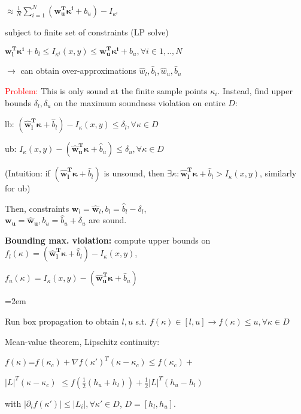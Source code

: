 \documentclass[11pt,landscape,a4paper,fleqn]{article}
\begin{document}
\begin{multicols*}{4}
\hspace*{16mm}$\approx \frac{1}{N} \sum_{i=1}^{N} (\mathbf{w_u^T \kappa^i} + b_u) - I_{\kappa^i}$

subject to finite set of constraints (LP solve)

{$\mathbf{w_l^T \kappa^i} + b_l \leq I_{\kappa^i}(x,y) \leq \mathbf{w_u^T \kappa^i} + b_u, \forall i \in {1,..,N}$}

$\rightarrow$ can obtain over-approximations $\hat{w}_l, \hat{b}_l, \hat{w}_u, \hat{b}_u$

\textcolor{red}{Problem:} This is only sound at the finite sample points $\kappa_i$. Instead, {find upper bounds $\delta_l, \delta_u$ on the maximum soundness violation on entire $D$}:

lb: $(\mathbf{\hat{w}_l^T \kappa} + \hat{b}_l) - I_\kappa(x,y) \leq \delta_l, \forall \kappa \in D$

ub: $I_\kappa(x,y) - (\mathbf{\hat{w}_u^T \kappa} + \hat{b}_u) \leq \delta_u, \forall \kappa \in D$

(Intuition: if $(\mathbf{\hat{w}_l^T \kappa} + \hat{b}_l)$ is unsound, then $\exists \kappa: \mathbf{\hat{w}_l^T \kappa} + \hat{b}_l > I_\kappa(x,y)$, similarly for ub)

Then, constraints $\mathbf{w}_l = \mathbf{\hat{w}}_l, b_l = \hat{b}_l - \delta_l$,\\
$\mathbf{w_u} = \mathbf{\hat{w}_u}, b_u = \hat{b}_u + \delta_u$ are sound.


\textbf{Bounding max. violation:} compute upper bounds on $f_l(\kappa) = (\mathbf{\hat{w}_l^T \kappa} + \hat{b}_l) - I_\kappa(x,y)$,

$f_u(\kappa) = I_\kappa(x,y) - (\mathbf{\hat{w}_u^T \kappa} + \hat{b}_u)$

\begin{compactitem}=2em
\item Run box propagation to obtain $l,u$ s.t. $f(\kappa) \in [l,u] \rightarrow f(\kappa) \leq u, \forall \kappa \in D$

\item Mean-value theorem, Lipschitz continuity:

\hspace*{-5mm} {$f(\kappa)$}=$f(\kappa_c) + \nabla f(\kappa')^T (\kappa - \kappa_c) \leq
f(\kappa_c) + $

\hspace*{-5mm} $|L|^T (\kappa - \kappa_c)$ {$\leq f(\frac{1}{2} (h_u + h_l)) + \frac{1}{2}|L|^T(h_u - h_l)$}

\vspace*{1mm}
with $|\partial_i f(\kappa')| \leq |L_i|, \forall \kappa' \in D$, $D = [h_l, h_u]$.


\end{compactitem}
\end{multicols*}
\end{document}
